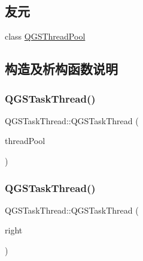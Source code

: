 \subsection*{友元}
\begin{DoxyCompactItemize}
\item 
class \mbox{\hyperlink{class_q_g_s_task_thread_a70a47fdd33a3809c10b9d17a5a520378}{Q\+G\+S\+Thread\+Pool}}
\end{DoxyCompactItemize}


\subsection{构造及析构函数说明}
\mbox{\label{class_q_g_s_task_thread_a09b030f627c2671cd7a241993afdf4f8}} 
\subsubsection{\texorpdfstring{Q\+G\+S\+Task\+Thread()}{QGSTaskThread()}\hspace{0.1cm}{\footnotesize\ttfamily [1/3]}}
{\footnotesize\ttfamily Q\+G\+S\+Task\+Thread\+::\+Q\+G\+S\+Task\+Thread (\begin{DoxyParamCaption}\item[{\mbox{\hyperlink{class_q_g_s_thread_pool}{Q\+G\+S\+Thread\+Pool}} $\ast$}]{thread\+Pool }\end{DoxyParamCaption})}

\mbox{\label{class_q_g_s_task_thread_a3d2d0d8b1467579ae8e1742db33d52b0}} 
\subsubsection{\texorpdfstring{Q\+G\+S\+Task\+Thread()}{QGSTaskThread()}\hspace{0.1cm}{\footnotesize\ttfamily [2/3]}}
{\footnotesize\ttfamily Q\+G\+S\+Task\+Thread\+::\+Q\+G\+S\+Task\+Thread (\begin{DoxyParamCaption}\item[{const \mbox{\hyperlink{class_q_g_s_task_thread}{Q\+G\+S\+Task\+Thread}} \&}]{right }\end{DoxyParamCaption})\hspace{0.3cm}{\ttfamily [delete]}}

